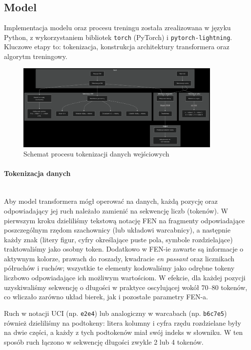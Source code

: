 \documentclass[12pt]{article}
\begin{document}
\subsection{Model}
Implementacja modelu oraz procesu treningu została zrealizowana w języku Python, z wykorzystaniem bibliotek \texttt{torch} (PyTorch) i \texttt{pytorch-lightning}. Kluczowe etapy to: tokenizacja, konstrukcja architektury transformera oraz algorytm treningowy.

\begin{figure}[H]
  \centering
  \includegraphics[width=0.9\textwidth]{graf1.png}
  \caption{Schemat procesu tokenizacji danych wejściowych}
\end{figure}

\paragraph{Tokenizacja danych}

\\Aby model transformera mógł operować na danych, każdą pozycję oraz odpowiadający jej ruch należało zamienić na sekwencję liczb (tokenów). W pierwszym kroku dzieliliśmy tekstową notację FEN na fragmenty odpowiadające poszczególnym rzędom szachownicy (lub układowi warcabnicy), a następnie każdy znak (litery figur, cyfry określające puste pola, symbole rozdzielające) traktowaliśmy jako osobny token. Dodatkowo w FEN-ie zawarte są informacje o aktywnym kolorze, prawach do roszady, kwadracie \emph{en passant} oraz licznikach półruchów i ruchów; wszystkie te elementy kodowaliśmy jako odrębne tokeny liczbowo odpowiadające ich możliwym wartościom. W efekcie, dla każdej pozycji uzyskiwaliśmy sekwencję o długości w praktyce oscylującej wokół 70–80 tokenów, co wliczało zarówno układ bierek, jak i pozostałe parametry FEN-a.

Ruch w notacji UCI (np. \texttt{e2e4}) lub analogiczny w warcabach (np. \texttt{b6c7e5}) również dzieliliśmy na podtokeny: litera kolumny i cyfra rzędu rozdzielane były na dwie części, a każdy z tych podtokenów miał swój indeks w słowniku. W ten sposób ruch łączono w sekwencję długości zwykle 2 lub 4 tokenów. 
\end{document}

